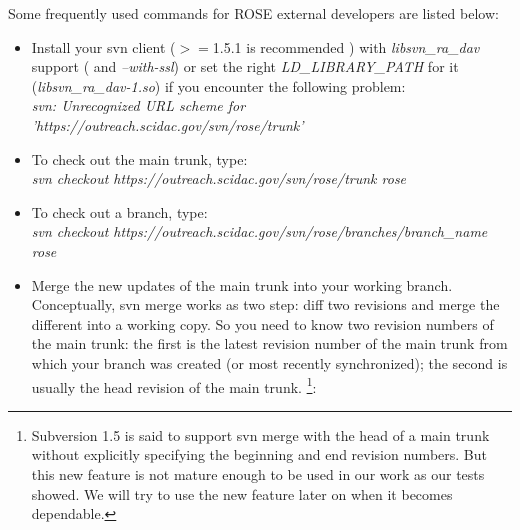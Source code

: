     Some frequently used commands for ROSE external developers are listed
    below:
    \begin{itemize}
  \item Install your svn client ($>=$1.5.1 is recommended ) with
    \textit{libsvn\_ra\_dav} support
    (
     and \textit{--with-ssl}) or set the right \textit{LD\_LIBRARY\_PATH} for it
    (\textit{libsvn\_ra\_dav-1.so}) if you encounter the following problem:\\
    \textit{svn: Unrecognized URL scheme for
      'https://outreach.scidac.gov/svn/rose/trunk'} 
      \item To check out the main trunk, type: \\
      \textit{svn checkout https://outreach.scidac.gov/svn/rose/trunk rose}
  \item To check out a branch, type: \\
    \textit{svn checkout
      https://outreach.scidac.gov/svn/rose/branches/branch\_name rose} 
      \item Merge the new updates of the main trunk into your working branch. 
      Conceptually, svn merge works as two step: diff two revisions and merge the different into a working copy.
      So you need to know two revision numbers of the main
      trunk:
      the first is
      the latest revision number of the main trunk from which your branch was
      created (or most recently synchronized);
  the second is usually the head revision of the main trunk.
    \footnote{Subversion 1.5 is said to support svn merge with the head of
      a main trunk without explicitly specifying the beginning and end revision
        numbers. But this new feature is not mature enough to be used in our work
        as our tests showed. We will try to use the new feature later on when it
        becomes dependable.}: 


\end{itemize}
